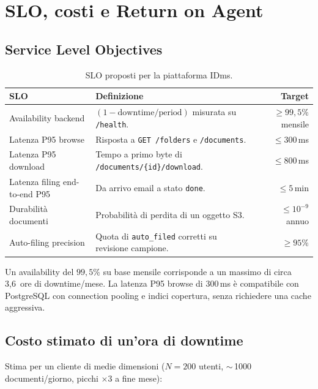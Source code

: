 \chapter{SLO, costi e Return on Agent}
\label{chap:roi}

\section{Service Level Objectives}
\label{sec:slo}

\begin{table}[ht]
\centering
\small
\begin{tabularx}{\linewidth}{l X r}
\toprule
\textbf{SLO} & \textbf{Definizione} & \textbf{Target} \\
\midrule
Availability backend          & $(1 - \text{downtime}/\text{period})$ misurata su \texttt{/health}. & $\geq 99{,}5\%$ mensile \\
Latenza P95 browse            & Risposta a \texttt{GET /folders} e \texttt{/documents}.             & $\leq 300$\,ms \\
Latenza P95 download          & Tempo a primo byte di \texttt{/documents/\{id\}/download}.          & $\leq 800$\,ms \\
Latenza filing end-to-end P95 & Da arrivo email a stato \texttt{done}.                              & $\leq 5$\,min \\
Durabilit\`a documenti        & Probabilit\`a di perdita di un oggetto S3.                         & $\leq 10^{-9}$ annuo \\
Auto-filing precision         & Quota di \texttt{auto\_filed} corretti su revisione campione.       & $\geq 95\%$ \\
\bottomrule
\end{tabularx}
\caption{SLO proposti per la piattaforma IDms.}
\label{tab:slo}
\end{table}

Un availability del $99{,}5\%$ su base mensile corrisponde a un massimo di circa
3,6~ore di downtime/mese. La latenza P95 browse di 300\,ms \`e compatibile con
PostgreSQL con connection pooling e indici copertura, senza richiedere una cache
aggressiva.

\section{Costo stimato di un'ora di downtime}
\label{sec:costo_downtime}

Stima per un cliente di medie dimensioni ($N = 200$ utenti, $\sim$\,1000
documenti/giorno, picchi $\times 3$ a fine mese):

